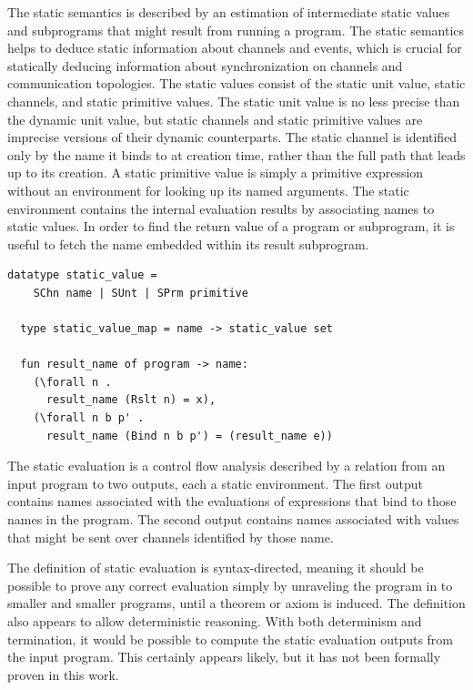 \documentclass[10pt]{article}
\begin{document}
The static semantics is described by an estimation of
intermediate static values and subprograms
that might result from running a program.    
The static semantics helps to deduce static information about channels and events, which is
crucial for statically deducing information about synchronization on channels and
communication topologies.
The static values consist of the static unit value, static channels, and static primitive
values. The static unit value is no less precise than the dynamic unit value, but
static channels and static primitive values are imprecise versions of their dynamic
counterparts. The static channel is identified only by the name it binds to at creation time,
rather than the full path that leads up to its creation.  A static primitive value is simply a
primitive expression without an environment for looking up its named arguments. The static
environment contains the internal evaluation results by associating names to static values.
In order to find the return value of a program or subprogram, it is useful to fetch the name
embedded within its result subprogram.

\begin{lstlisting}[language=logic, mathescape]
  datatype static_value =
    SChn name | SUnt | SPrm primitive 

  type static_value_map = name -> static_value set

  fun result_name of program -> name:
    (\forall n .
      result_name (Rslt n) = x),
    (\forall n b p' . 
      result_name (Bind n b p') = (result_name e))
  \end{lstlisting}


The static evaluation is a control flow analysis described by a relation from an input program
to two outputs, each a static environment. The first output contains names associated with the
evaluations of expressions that bind to those names in the program. The second output contains
names associated with values that might be sent over channels identified by those name.

The definition of static evaluation is syntax-directed, meaning it should be possible to
prove any correct evaluation simply by unraveling the program in to smaller and smaller
programs, until a theorem or axiom is induced. The definition also appears to allow
deterministic reasoning. With both determinism and termination, it would be possible to compute
the static evaluation outputs from the input program. This certainly appears likely, but it has
not been formally proven in this work.
\end{document}
